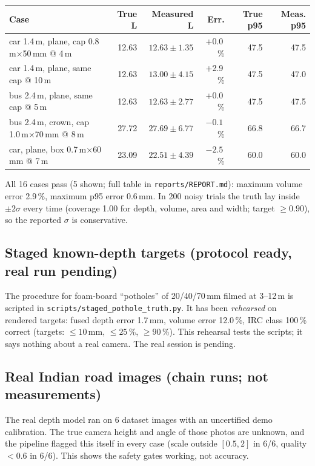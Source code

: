 \documentclass[11pt,a4paper]{article}
\newcommand{\code}[1]{\texttt{\small #1}}
\begin{document}
\begin{center}
\small
\begin{tabular}{@{}l r r r r r@{}}
\toprule
\textbf{Case} & \textbf{True L} & \textbf{Measured L} & \textbf{Err.} & \textbf{True p95} & \textbf{Meas. p95}\\
\midrule
car 1.4\,m, plane, cap 0.8\,m$\times$50\,mm @ 4\,m & 12.63 & $12.63\pm1.35$ & +0.0\,\% & 47.5 & 47.5\\
car 1.4\,m, plane, same cap @ 10\,m & 12.63 & $13.00\pm4.15$ & +2.9\,\% & 47.5 & 47.0\\
bus 2.4\,m, plane, same cap @ 5\,m & 12.63 & $12.63\pm2.77$ & +0.0\,\% & 47.5 & 47.5\\
bus 2.4\,m, crown, cap 1.0\,m$\times$70\,mm @ 8\,m & 27.72 & $27.69\pm6.77$ & $-0.1$\,\% & 66.8 & 66.7\\
car, plane, box 0.7\,m$\times$60\,mm @ 7\,m & 23.09 & $22.51\pm4.39$ & $-2.5$\,\% & 60.0 & 60.0\\
\bottomrule
\end{tabular}
\end{center}
All 16 cases pass (5 shown; full table in \code{reports/REPORT.md}): maximum volume error 2.9\,\%, maximum p95
error 0.6\,mm. In 200 noisy trials the truth lay inside $\pm2\sigma$ every time (coverage 1.00 for depth, volume,
area and width; target $\ge0.90$), so the reported $\sigma$ is conservative.

\subsection{Staged known-depth targets (protocol ready, real run pending)}
The procedure for foam-board ``potholes'' of 20/40/70\,mm filmed at 3--12\,m is scripted in
\code{scripts/staged\_pothole\_truth.py}. It has been \emph{rehearsed} on rendered targets: fused depth error
1.7\,mm, volume error 12.0\,\%, IRC class 100\,\% correct (targets: $\le10$\,mm, $\le25$\,\%, $\ge90$\,\%). This rehearsal
tests the scripts; it says nothing about a real camera. The real session is pending.

\subsection{Real Indian road images (chain runs; not measurements)}
The real depth model ran on 6 dataset images with an uncertified demo calibration. The true camera height and
angle of those photos are unknown, and the pipeline flagged this itself in every case (scale outside $[0.5,2]$ in
6/6, quality $<0.6$ in 6/6). This shows the safety gates working, not accuracy.
\end{document}

